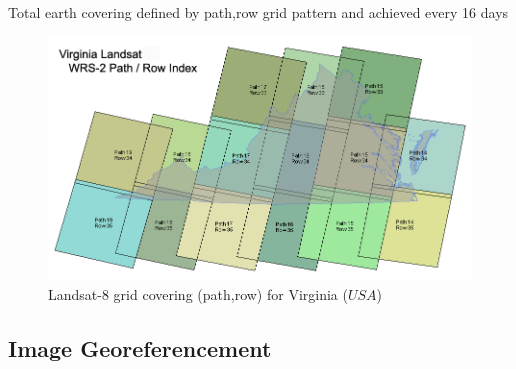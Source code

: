 \documentclass[c]{beamer}
\begin{document}
\begin{frame}
Total earth covering defined by path,row grid pattern and achieved every 16 days
\begin{figure}
  \includegraphics[scale=0.13]{images/covering/wrs.png}
  \caption{Landsat-8 grid covering (path,row) for Virginia ($USA$) }
\end{figure}
\end{frame}

\subsection{Image Georeferencement}
\begin{frame}
\tableofcontents[currentsubsection]
\end{frame}
\end{document}

